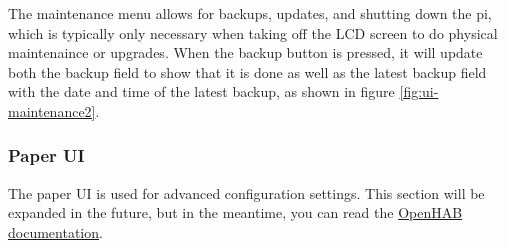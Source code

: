 The maintenance menu allows for backups, updates, and shutting down the pi,
which is typically only necessary when taking off the LCD screen to do physical
maintenaince or upgrades.  When the backup button is pressed, it will update
both the backup field to show that it is done as well as the latest backup
field with the date and time of the latest backup, as shown in figure
\ref{fig:ui-maintenance2}.

\subsubsection{Paper UI} \label{Paper UI}
The paper UI is used for advanced configuration settings.  This section will be
expanded in the future, but in the meantime, you can read the
\href{https://www.openhab.org/docs/}{OpenHAB documentation}.

